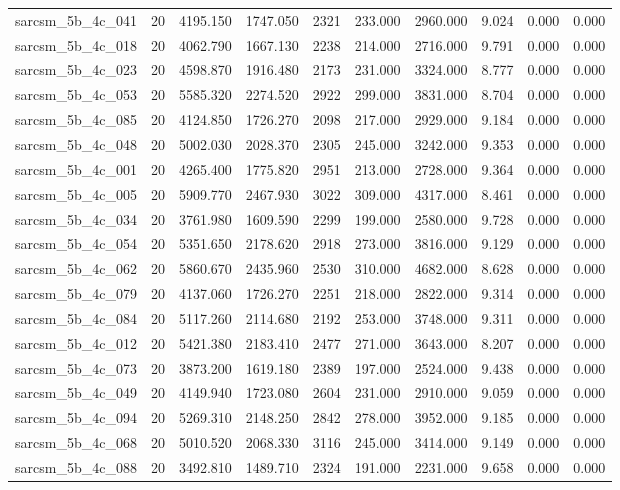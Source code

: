 \begin{tabular}{lrrrrrrrrr}
sarcsm\_5b\_4c\_041 & 20 & 4195.150 & 1747.050 & 2321 & 233.000 & 2960.000 & 9.024 & 0.000 & 0.000 \\
sarcsm\_5b\_4c\_018 & 20 & 4062.790 & 1667.130 & 2238 & 214.000 & 2716.000 & 9.791 & 0.000 & 0.000 \\
sarcsm\_5b\_4c\_023 & 20 & 4598.870 & 1916.480 & 2173 & 231.000 & 3324.000 & 8.777 & 0.000 & 0.000 \\
sarcsm\_5b\_4c\_053 & 20 & 5585.320 & 2274.520 & 2922 & 299.000 & 3831.000 & 8.704 & 0.000 & 0.000 \\
sarcsm\_5b\_4c\_085 & 20 & 4124.850 & 1726.270 & 2098 & 217.000 & 2929.000 & 9.184 & 0.000 & 0.000 \\
sarcsm\_5b\_4c\_048 & 20 & 5002.030 & 2028.370 & 2305 & 245.000 & 3242.000 & 9.353 & 0.000 & 0.000 \\
sarcsm\_5b\_4c\_001 & 20 & 4265.400 & 1775.820 & 2951 & 213.000 & 2728.000 & 9.364 & 0.000 & 0.000 \\
sarcsm\_5b\_4c\_005 & 20 & 5909.770 & 2467.930 & 3022 & 309.000 & 4317.000 & 8.461 & 0.000 & 0.000 \\
sarcsm\_5b\_4c\_034 & 20 & 3761.980 & 1609.590 & 2299 & 199.000 & 2580.000 & 9.728 & 0.000 & 0.000 \\
sarcsm\_5b\_4c\_054 & 20 & 5351.650 & 2178.620 & 2918 & 273.000 & 3816.000 & 9.129 & 0.000 & 0.000 \\
sarcsm\_5b\_4c\_062 & 20 & 5860.670 & 2435.960 & 2530 & 310.000 & 4682.000 & 8.628 & 0.000 & 0.000 \\
sarcsm\_5b\_4c\_079 & 20 & 4137.060 & 1726.270 & 2251 & 218.000 & 2822.000 & 9.314 & 0.000 & 0.000 \\
sarcsm\_5b\_4c\_084 & 20 & 5117.260 & 2114.680 & 2192 & 253.000 & 3748.000 & 9.311 & 0.000 & 0.000 \\
sarcsm\_5b\_4c\_012 & 20 & 5421.380 & 2183.410 & 2477 & 271.000 & 3643.000 & 8.207 & 0.000 & 0.000 \\
sarcsm\_5b\_4c\_073 & 20 & 3873.200 & 1619.180 & 2389 & 197.000 & 2524.000 & 9.438 & 0.000 & 0.000 \\
sarcsm\_5b\_4c\_049 & 20 & 4149.940 & 1723.080 & 2604 & 231.000 & 2910.000 & 9.059 & 0.000 & 0.000 \\
sarcsm\_5b\_4c\_094 & 20 & 5269.310 & 2148.250 & 2842 & 278.000 & 3952.000 & 9.185 & 0.000 & 0.000 \\
sarcsm\_5b\_4c\_068 & 20 & 5010.520 & 2068.330 & 3116 & 245.000 & 3414.000 & 9.149 & 0.000 & 0.000 \\
sarcsm\_5b\_4c\_088 & 20 & 3492.810 & 1489.710 & 2324 & 191.000 & 2231.000 & 9.658 & 0.000 & 0.000 \\

\end{tabular}
